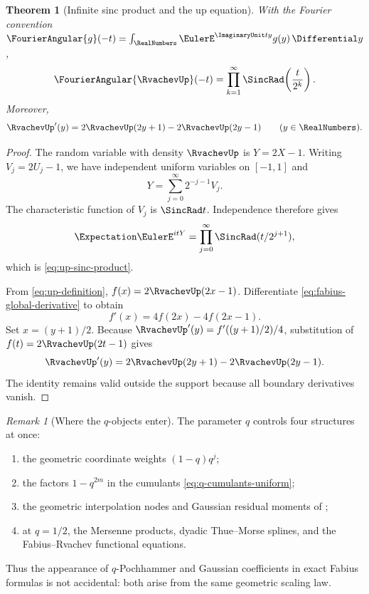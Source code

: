 \documentclass[11pt,a4paper,oneside,openany]{book}
\newtheorem{theorem}{Theorem}[chapter]
\theoremstyle{definition}
\theoremstyle{remark}
\newtheorem{remark}[remark]{Remark}
\begin{document}
\begin{theorem}[Infinite sinc product and the up equation]\label{thm:up-sinc-product}
With the Fourier convention
$\FourierAngular{g}(-t)=\int_{\RealNumbers}\EulerE^{\ImaginaryUnit ty}g(y)\,\Differential y$,
\begin{equation}\label{eq:up-sinc-product}
 \FourierAngular{\RvachevUp}(-t)
 =\prod_{k=1}^{\infty}\SincRad\!\left(\frac{t}{2^k}\right).
\end{equation}
Moreover,
\begin{equation}\label{eq:up-functional-differential}
 \RvachevUp'(y)
 =2\RvachevUp(2y+1)-2\RvachevUp(2y-1)
 \qquad(y\in\RealNumbers).
\end{equation}
\end{theorem}

\begin{proof}
The random variable with density $\RvachevUp$ is
$Y=2X-1$.  Writing $V_j=2U_j-1$, we have independent uniform variables on $[-1,1]$ and
\[
 Y=\sum_{j=0}^{\infty}2^{-j-1}V_j.
\]
The characteristic function of $V_j$ is $\SincRad t$.  Independence therefore gives
\[
 \Expectation \EulerE^{itY}
 =\prod_{j=0}^{\infty}\SincRad(t/2^{j+1}),
\]
which is \eqref{eq:up-sinc-product}.

From \eqref{eq:up-definition},
$f(x)=2\RvachevUp(2x-1)$.  Differentiate
\eqref{eq:fabius-global-derivative} to obtain
\[
 f'(x)=4f(2x)-4f(2x-1).
\]
Set $x=(y+1)/2$.  Because
$\RvachevUp'(y)=f'((y+1)/2)/4$, substitution of
$f(t)=2\RvachevUp(2t-1)$ gives
\[
 \RvachevUp'(y)
 =2\RvachevUp(2y+1)-2\RvachevUp(2y-1).
\]
The identity remains valid outside the support because all boundary derivatives vanish.
\end{proof}

\begin{remark}[Where the $q$-objects enter]
The parameter $q$ controls four structures at once:
\begin{enumerate}
\item the geometric coordinate weights $(1-q)q^j$;
\item the factors $1-q^{2m}$ in the cumulants \eqref{eq:q-cumulants-uniform};
\item the geometric interpolation nodes and Gaussian residual moments of ;
\item at $q=1/2$, the Mersenne products, dyadic Thue--Morse splines, and the Fabius--Rvachev functional equations.
\end{enumerate}
Thus the appearance of $q$-Pochhammer and Gaussian coefficients in exact Fabius formulas is not accidental: both arise from the same geometric scaling law.
\end{remark}
\end{document}
